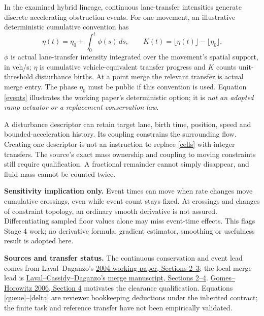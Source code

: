 \documentclass[11pt,a4paper]{article}
\begin{document}
In the examined hybrid lineage, continuous lane-transfer intensities generate
discrete accelerating obstruction events. For one movement, an illustrative
deterministic cumulative convention has
\begin{equation}
\eta(t)=\eta_0+\int_0^t\phi(s)\,ds,\qquad
K(t)=\lfloor\eta(t)\rfloor-\lfloor\eta_0\rfloor. \label{events}
\end{equation}
$\phi$ is actual lane-transfer intensity integrated over the movement's spatial
support, in veh/s; $\eta$ is cumulative vehicle-equivalent transfer progress and
$K$ counts unit-threshold disturbance births. At a point merge the relevant
transfer is actual merge entry. The phase $\eta_0$ must be public if this convention
is used. Equation \eqref{events} illustrates the working paper's deterministic
option; it is \emph{not an adopted ramp actuator or a replacement conservation law}.

A disturbance descriptor can retain target lane, birth time, position, speed
and bounded-acceleration history. Its coupling constrains the surrounding flow.
Creating one descriptor is not an instruction to replace \eqref{cells} with
integer transfers. The source's exact mass ownership and coupling to moving
constraints still require qualification. A fractional remainder cannot
simply disappear, and fluid mass cannot be counted twice.

\textbf{Sensitivity implication only.} Event times can move when rate changes
move cumulative crossings, even while event count stays fixed. At crossings
and changes of constraint topology, an ordinary smooth derivative is not assured.
Differentiating sampled floor values alone may miss event-time effects. This
flags Stage 4 work; no derivative formula, gradient estimator, smoothing or
usefulness result is adopted here.

\textbf{Sources and transfer status.} The continuous conservation and event lead
comes from Laval--Daganzo's
\href{https://escholarship.org/content/qt8w70q261/qt8w70q261.pdf}{2004 working paper,
Sections 2--3}; the local merge lead is
\href{https://bpb-us-e1.wpmucdn.com/sites.gatech.edu/dist/f/3571/files/2023/03/merges.pdf}{Laval--Cassidy--Daganzo's merge manuscript, Sections 2--4}.
\href{https://horowitz.me.berkeley.edu/Publications_files/All_papers_numbered/80J_Gomes_TRC06.pdf}{Gomes--Horowitz 2006, Section 4}
motivates the clearance qualification. Equations \eqref{queue}--\eqref{delta}
are reviewer bookkeeping deductions under the inherited contract; the finite
task and reference transfer have not been empirically validated.
\end{document}
